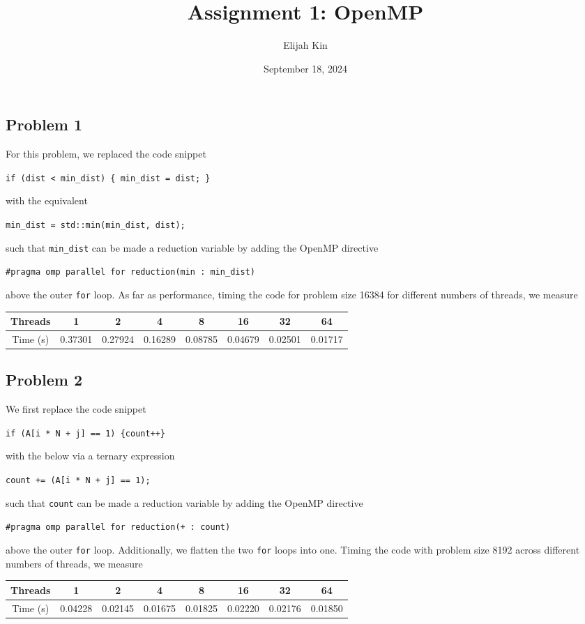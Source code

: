 \documentclass{article}
\title{Assignment 1: OpenMP}
\author{Elijah Kin}
\date{September 18, 2024}
\begin{document}
  \maketitle

  \subsection*{Problem 1}
  For this problem, we replaced the code snippet
  \begin{center}
    \texttt{if (dist < min\_dist) \{ min\_dist = dist; \} }
  \end{center}
  with the equivalent
  \begin{center}
    \texttt{min\_dist = std::min(min\_dist, dist);}
  \end{center}
  such that \texttt{min\_dist} can be made a reduction variable by adding the OpenMP directive
  \begin{center}
    \texttt{\#pragma omp parallel for reduction(min : min\_dist)}
  \end{center}
  above the outer \texttt{for} loop. As far as performance, timing the code for problem size 16384 for different numbers of threads, we measure
  \begin{center}
    \begin{tabular}{ |c|c|c|c|c|c|c|c| }
     \hline
     Threads & 1 & 2 & 4 & 8 & 16 & 32 & 64 \\
     \hline
     Time (s) & 0.37301 & 0.27924 & 0.16289 & 0.08785 & 0.04679 & 0.02501 & 0.01717 \\
     \hline
    \end{tabular}
  \end{center}

  \subsection*{Problem 2}
  We first replace the code snippet
  \begin{center}
    \texttt{if (A[i * N + j] == 1) \{count++\}}
  \end{center}
  with the below via a ternary expression
  \begin{center}
    \texttt{count += (A[i * N + j] == 1);}
  \end{center}
  such that \texttt{count} can be made a reduction variable by adding the OpenMP directive
  \begin{center}
    \texttt{\#pragma omp parallel for reduction(+ : count)}
  \end{center}
  above the outer \texttt{for} loop. Additionally, we flatten the two \texttt{for} loops into one. Timing the code with problem size 8192 across different numbers of threads, we measure
  \begin{center}
    \begin{tabular}{ |c|c|c|c|c|c|c|c| }
     \hline
     Threads & 1 & 2 & 4 & 8 & 16 & 32 & 64 \\
     \hline
     Time (s) & 0.04228 & 0.02145 & 0.01675 & 0.01825 & 0.02220 & 0.02176 & 0.01850 \\
     \hline
    \end{tabular}
  \end{center}
\end{document}
